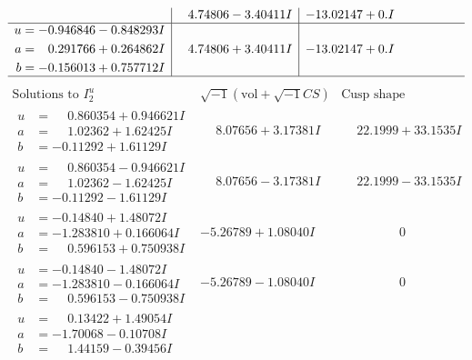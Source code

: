 \documentclass[1p]{elsarticle_modified}
\theoremstyle{definition}
\newcommand{\I}{\sqrt{-1}}
\begin{document}
$$\begin{array}{c|c|c}
 & \phantom{-}4.74806 - 3.40411 I & -13.02147 + 0. I\phantom{ +0.000000I} \\ \hline\begin{aligned}
u &= -0.946846 - 0.848293 I \\
a &= \phantom{-}0.291766 + 0.264862 I \\
b &= -0.156013 + 0.757712 I\end{aligned}
 & \phantom{-}4.74806 + 3.40411 I & -13.02147 + 0. I\phantom{ +0.000000I}\\
 \hline 
 \end{array}$$\newpage$$\begin{array}{c|c|c}  
\text{Solutions to }I^u_{2}& \I (\text{vol} + \sqrt{-1}CS) & \text{Cusp shape}\\
 \hline 
\begin{aligned}
u &= \phantom{-}0.860354 + 0.946621 I \\
a &= \phantom{-}1.02362 + 1.62425 I \\
b &= -0.11292 + 1.61129 I\end{aligned}
 & \phantom{-}8.07656 + 3.17381 I & \phantom{-}22.1999 + 33.1535 I \\ \hline\begin{aligned}
u &= \phantom{-}0.860354 - 0.946621 I \\
a &= \phantom{-}1.02362 - 1.62425 I \\
b &= -0.11292 - 1.61129 I\end{aligned}
 & \phantom{-}8.07656 - 3.17381 I & \phantom{-}22.1999 - 33.1535 I \\ \hline\begin{aligned}
u &= -0.14840 + 1.48072 I \\
a &= -1.283810 + 0.166064 I \\
b &= \phantom{-}0.596153 + 0.750938 I\end{aligned}
 & -5.26789 + 1.08040 I & \phantom{-0.000000 } 0 \\ \hline\begin{aligned}
u &= -0.14840 - 1.48072 I \\
a &= -1.283810 - 0.166064 I \\
b &= \phantom{-}0.596153 - 0.750938 I\end{aligned}
 & -5.26789 - 1.08040 I & \phantom{-0.000000 } 0 \\ \hline\begin{aligned}
u &= \phantom{-}0.13422 + 1.49054 I \\
a &= -1.70068 - 0.10708 I \\
b &= \phantom{-}1.44159 - 0.39456 I\end{aligned}

\end{array}$$
\end{document}

